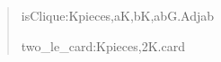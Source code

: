 \documentclass[spanish,11pt,a4paper]{article}
\newlength{\LeanCharWidth}
\begin{document}
\begin{quote}
\noindent \hspace*{\dimexpr 2\LeanCharWidth\relax}isClique\hspace*{\dimexpr 1\LeanCharWidth\relax}:\hspace*{\dimexpr 1\LeanCharWidth\relax}{\LeanSymbols ∀}\hspace*{\dimexpr 1\LeanCharWidth\relax}K\hspace*{\dimexpr 1\LeanCharWidth\relax}{\LeanSymbols ∈}\hspace*{\dimexpr 1\LeanCharWidth\relax}pieces,\hspace*{\dimexpr 1\LeanCharWidth\relax}{\LeanSymbols ∀}\hspace*{\dimexpr 1\LeanCharWidth\relax}a\hspace*{\dimexpr 1\LeanCharWidth\relax}{\LeanSymbols ∈}\hspace*{\dimexpr 1\LeanCharWidth\relax}K,\hspace*{\dimexpr 1\LeanCharWidth\relax}{\LeanSymbols ∀}\hspace*{\dimexpr 1\LeanCharWidth\relax}b\hspace*{\dimexpr 1\LeanCharWidth\relax}{\LeanSymbols ∈}\hspace*{\dimexpr 1\LeanCharWidth\relax}K,\hspace*{\dimexpr 1\LeanCharWidth\relax}a\hspace*{\dimexpr 1\LeanCharWidth\relax}{\LeanSymbols ≠}\hspace*{\dimexpr 1\LeanCharWidth\relax}b\hspace*{\dimexpr 1\LeanCharWidth\relax}{\LeanSymbols →}\hspace*{\dimexpr 1\LeanCharWidth\relax}G.Adj\hspace*{\dimexpr 1\LeanCharWidth\relax}a\hspace*{\dimexpr 1\LeanCharWidth\relax}b\par
\noindent \hspace*{\dimexpr 2\LeanCharWidth\relax}two\_le\_card\hspace*{\dimexpr 1\LeanCharWidth\relax}:\hspace*{\dimexpr 1\LeanCharWidth\relax}{\LeanSymbols ∀}\hspace*{\dimexpr 1\LeanCharWidth\relax}K\hspace*{\dimexpr 1\LeanCharWidth\relax}{\LeanSymbols ∈}\hspace*{\dimexpr 1\LeanCharWidth\relax}pieces,\hspace*{\dimexpr 1\LeanCharWidth\relax}2\hspace*{\dimexpr 1\LeanCharWidth\relax}{\LeanSymbols ≤}\hspace*{\dimexpr 1\LeanCharWidth\relax}K.card\par

\end{quote}
\end{document}
